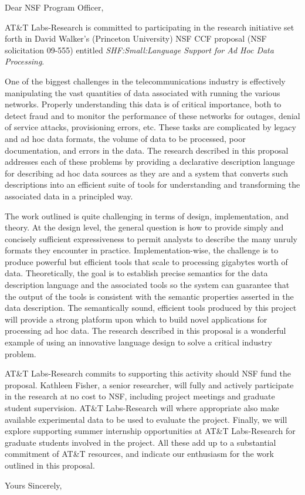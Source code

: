 \documentclass{letter}
\begin{document}
\begin{letter}{
}

\opening{Dear NSF Program Officer,} 

AT\&T Labs-Research is committed to participating in the research
initiative set forth in David Walker's (Princeton University)
NSF CCF proposal (NSF solicitation 09-555) 
entitled {\em SHF:Small:Language Support for Ad Hoc Data Processing}.

One of the biggest challenges in the telecommunications industry is
effectively manipulating the vast quantities of data associated with
running the various networks. Properly understanding this data is of
critical importance, both to detect fraud and to monitor the
performance of these networks for outages, denial of service attacks,
provisioning errors, etc. These tasks are complicated by legacy and ad
hoc data formats, the volume of data to be processed, poor
documentation, and errors in the data. The research described in this
proposal addresses each of these problems by providing a declarative
description language for describing ad hoc data sources as they are
and a system that converts such descriptions into an efficient suite
of tools for understanding and transforming the associated data in a
principled way.

The work outlined is quite challenging in terms of design,
implementation, and theory. At the design level, the general question is how
to provide simply and concisely sufficient expressiveness to permit
analysts to describe the many unruly formats they encounter in
practice. Implementation-wise, the challenge is to produce powerful
but efficient tools that scale to processing gigabytes worth of
data. Theoretically, the goal is to establish precise semantics for
the data description language and the associated tools so the system
can guarantee that the output of the tools is consistent with the
semantic properties asserted in the data description. The semantically
sound, efficient tools produced by this project will provide a strong
platform upon which to build novel applications for processing ad hoc
data. The research described in this proposal is a wonderful example
of using an innovative language design to solve a critical industry
problem.

AT\&T Labs-Research commits to supporting this activity should NSF
fund the proposal. Kathleen Fisher, a senior researcher, will fully
and actively participate in the research at no cost to NSF, including
project meetings and graduate student supervision. AT\&T Labs-Research
will where appropriate also make available experimental data to be
used to evaluate the project. Finally, we will explore supporting
summer internship opportunities at AT\&T Labs-Research for graduate
students involved in the project. All these add up to a substantial
commitment of AT\&T resources, and indicate our enthusiasm for the
work outlined in this proposal.

\closing{Yours Sincerely,}

\end{letter}
\end{document}
